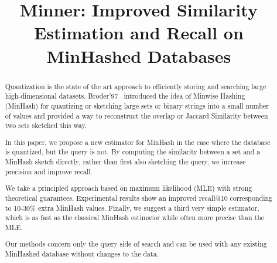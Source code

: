 
\title{Minner: Improved Similarity Estimation and Recall on MinHashed Databases}

\begin{abstract}
   Quantization is the state of the art approach to efficiently storing and searching large high-dimensional datasets.
   Broder'97~\cite{broder1997resemblance} introduced the idea of Minwise Hashing (MinHash) for quantizing or sketching large sets or binary strings into a small number of values and provided a way to reconstruct the overlap or Jaccard Similarity between two sets sketched this way.

   In this paper, we propose a new estimator for MinHash in the case where the database is quantized, but the query is not.
   By computing the similarity between a set and a MinHash sketch directly, rather than first also sketching the query, we increase precision and improve recall.

   We take a principled approach based on maximum likelihood (MLE) with strong theoretical guarantees.
   Experimental results show
   an improved recall@10 corresponding to 10-30\% extra MinHash values.
   Finally, we suggest a third very simple estimator, which is as fast as the classical MinHash estimator while often more precise than the MLE.

   Our methods concern only the query side of search and can be used with any existing MinHashed database without changes to the data.






\end{abstract}

